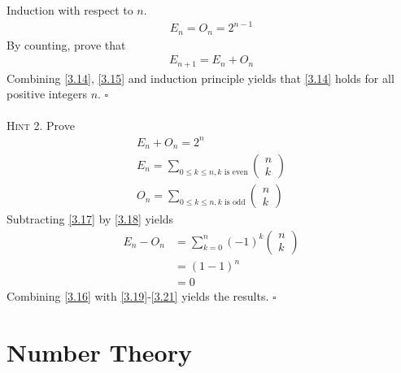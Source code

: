 \documentclass[a4paper,oneside]{article}
\numberwithin{equation}{section}
\begin{document}
Induction with respect to $n$.
\begin{align}
\label{3.14}
{E_n} = {O_n} = {2^{n - 1}}
\end{align}
By counting, prove that
\begin{align}
\label{3.15}
{E_{n + 1}} = {E_n} + {O_n}
\end{align}
Combining \eqref{3.14}, \eqref{3.15} and induction principle yields that \eqref{3.14} holds for all positive integers $n$. \hfill $\square$\\
\\
\textsc{Hint 2.} Prove 
\begin{align}
{E_n} + {O_n} = {2^n} \label{3.16}\\
{E_n} = \sum\limits_{0 \le k \le n,k \mbox{ is even}} {\left( {\begin{array}{*{20}{c}}
n\\
k
\end{array}} \right)} \label{3.17}\\
{O_n} = \sum\limits_{0 \le k \le n,k\mbox{ is odd}} {\left( {\begin{array}{*{20}{c}}
n\\
k
\end{array}} \right)} \label{3.18}
\end{align}
Subtracting \eqref{3.17} by \eqref{3.18} yields
\begin{align} 
\label{3.19}
{E_n} - {O_n} &= \sum\limits_{k = 0}^n {{{\left( { - 1} \right)}^k}\left( {\begin{array}{*{20}{c}}
n\\
k
\end{array}} \right)} \\
 &= {\left( {1 - 1} \right)^n}\\
& = 0 \label{3.21}
\end{align}
Combining \eqref{3.16} with \eqref{3.19}-\eqref{3.21} yields the results. \hfill $\square$

\section{Number Theory}
\end{document}
